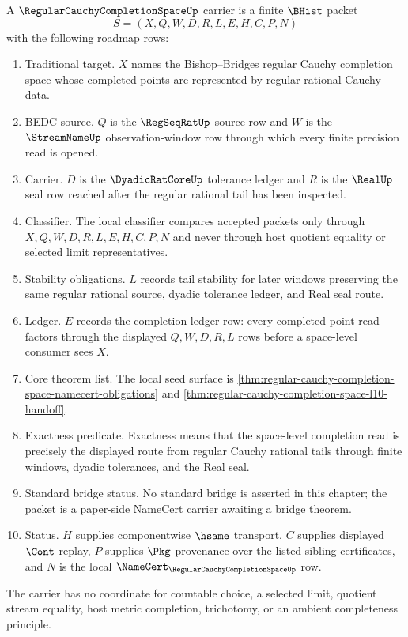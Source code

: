 \begin{definition}
\label{def:regular-cauchy-completion-space-carrier}
A $\RegularCauchyCompletionSpaceUp$ carrier is a finite $\BHist$ packet
$$
S=(X,Q,W,D,R,L,E,H,C,P,N)
$$
with the following roadmap rows:
\begin{enumerate}
\item Traditional target. $X$ names the Bishop--Bridges regular Cauchy completion space whose completed points are represented by regular rational Cauchy data.
\item BEDC source. $Q$ is the $\RegSeqRatUp$ source row and $W$ is the $\StreamNameUp$ observation-window row through which every finite precision read is opened.
\item Carrier. $D$ is the $\DyadicRatCoreUp$ tolerance ledger and $R$ is the $\RealUp$ seal row reached after the regular rational tail has been inspected.
\item Classifier. The local classifier compares accepted packets only through $X,Q,W,D,R,L,E,H,C,P,N$ and never through host quotient equality or selected limit representatives.
\item Stability obligations. $L$ records tail stability for later windows preserving the same regular rational source, dyadic tolerance ledger, and Real seal route.
\item Ledger. $E$ records the completion ledger row: every completed point read factors through the displayed $Q,W,D,R,L$ rows before a space-level consumer sees $X$.
\item Core theorem list. The local seed surface is \autoref{thm:regular-cauchy-completion-space-namecert-obligations} and \autoref{thm:regular-cauchy-completion-space-l10-handoff}.
\item Exactness predicate. Exactness means that the space-level completion read is precisely the displayed route from regular Cauchy rational tails through finite windows, dyadic tolerances, and the Real seal.
\item Standard bridge status. No standard bridge is asserted in this chapter; the packet is a paper-side NameCert carrier awaiting a bridge theorem.
\item Status. $H$ supplies componentwise $\hsame$ transport, $C$ supplies displayed $\Cont$ replay, $P$ supplies $\Pkg$ provenance over the listed sibling certificates, and $N$ is the local $\NameCert_{\RegularCauchyCompletionSpaceUp}$ row.
\end{enumerate}
The carrier has no coordinate for countable choice, a selected limit, quotient stream equality, host metric completion, trichotomy, or an ambient completeness principle.
\end{definition}

